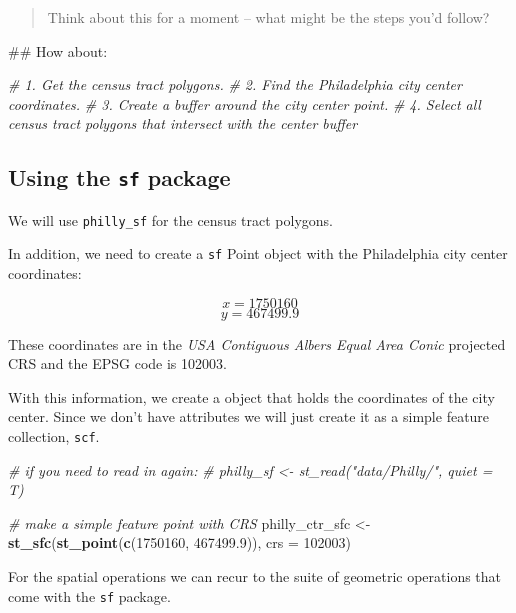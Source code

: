 \documentclass[]{book}
\newenvironment{Shaded}{\begin{snugshade}}{\end{snugshade}}
\newcommand{\KeywordTok}[1]{\textcolor[rgb]{0.13,0.29,0.53}{\textbf{#1}}}
\newcommand{\DataTypeTok}[1]{\textcolor[rgb]{0.13,0.29,0.53}{#1}}
\newcommand{\DecValTok}[1]{\textcolor[rgb]{0.00,0.00,0.81}{#1}}
\newcommand{\FloatTok}[1]{\textcolor[rgb]{0.00,0.00,0.81}{#1}}
\newcommand{\StringTok}[1]{\textcolor[rgb]{0.31,0.60,0.02}{#1}}
\newcommand{\CommentTok}[1]{\textcolor[rgb]{0.56,0.35,0.01}{\textit{#1}}}
\newcommand{\NormalTok}[1]{#1}
\begin{document}
\begin{quote}
Think about this for a moment -- what might be the steps you'd follow?
\end{quote}

\begin{Shaded}
\begin{Highlighting}[]
\NormalTok{## How about:}

\CommentTok{# 1. Get the census tract polygons.}
\CommentTok{# 2. Find the Philadelphia city center coordinates.}
\CommentTok{# 3. Create a buffer around the city center point.}
\CommentTok{# 4. Select all census tract polygons that intersect with the center buffer}
\end{Highlighting}
\end{Shaded}

\subsection{\texorpdfstring{Using the \texttt{sf}
package}{Using the sf package}}\label{using-the-sf-package}

We will use \texttt{philly\_sf} for the census tract polygons.

In addition, we need to create a \texttt{sf} Point object with the
Philadelphia city center coordinates:

\[x = 1750160\] \[y = 467499.9\]

These coordinates are in the \emph{USA Contiguous Albers Equal Area
Conic} projected CRS and the EPSG code is 102003.

With this information, we create a object that holds the coordinates of
the city center. Since we don't have attributes we will just create it
as a simple feature collection, \texttt{scf}.

\begin{Shaded}
\begin{Highlighting}[]
\CommentTok{# if you need to read in again:}
\CommentTok{# philly_sf <- st_read("data/Philly/", quiet = T)}

\CommentTok{# make a simple feature point with CRS}
\NormalTok{philly_ctr_sfc <-}\StringTok{ }\KeywordTok{st_sfc}\NormalTok{(}\KeywordTok{st_point}\NormalTok{(}\KeywordTok{c}\NormalTok{(}\DecValTok{1750160}\NormalTok{, }\FloatTok{467499.9}\NormalTok{)), }\DataTypeTok{crs =} \DecValTok{102003}\NormalTok{)}
\end{Highlighting}
\end{Shaded}

For the spatial operations we can recur to the suite of geometric
operations that come with the \texttt{sf} package.
\end{document}
